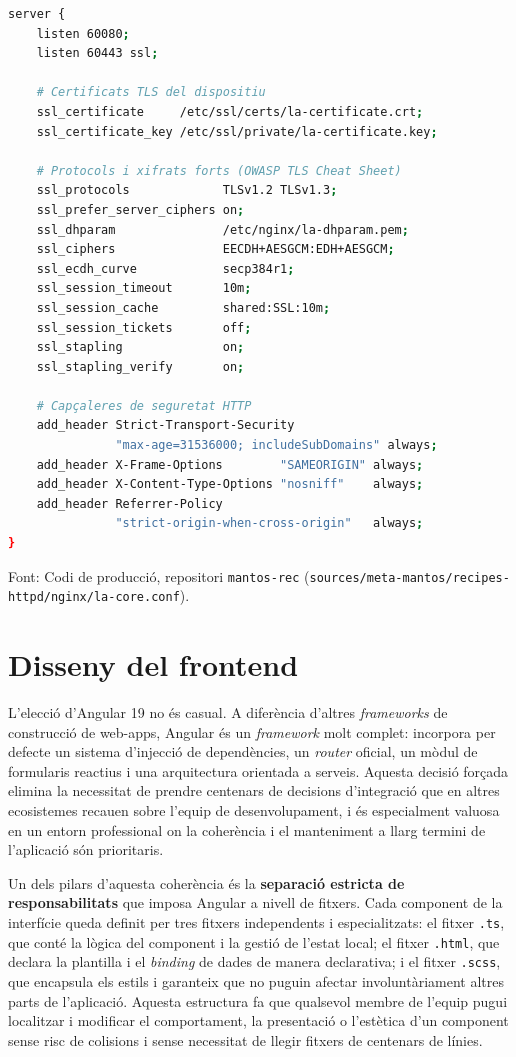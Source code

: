 \clearpage
\begin{lstlisting}[language=bash, label={lst:nginx_security}, caption={Fragment de la configuració NGINX (la-core.conf): TLS i capçaleres de seguretat HTTP.}, float=!ht]
server {
    listen 60080;
    listen 60443 ssl;

    # Certificats TLS del dispositiu
    ssl_certificate     /etc/ssl/certs/la-certificate.crt;
    ssl_certificate_key /etc/ssl/private/la-certificate.key;

    # Protocols i xifrats forts (OWASP TLS Cheat Sheet)
    ssl_protocols             TLSv1.2 TLSv1.3;
    ssl_prefer_server_ciphers on;
    ssl_dhparam               /etc/nginx/la-dhparam.pem;
    ssl_ciphers               EECDH+AESGCM:EDH+AESGCM;
    ssl_ecdh_curve            secp384r1;
    ssl_session_timeout       10m;
    ssl_session_cache         shared:SSL:10m;
    ssl_session_tickets       off;
    ssl_stapling              on;
    ssl_stapling_verify       on;

    # Capçaleres de seguretat HTTP
    add_header Strict-Transport-Security
               "max-age=31536000; includeSubDomains" always;
    add_header X-Frame-Options        "SAMEORIGIN" always;
    add_header X-Content-Type-Options "nosniff"    always;
    add_header Referrer-Policy
               "strict-origin-when-cross-origin"   always;
}
\end{lstlisting}
\smallskip\par{\small\noindent Font: Codi de producció, repositori \texttt{mantos-rec} (\texttt{sources/\allowbreak{}meta-mantos/\allowbreak{}recipes-httpd/\allowbreak{}nginx/\allowbreak{}la-core.conf}).}

\section{Disseny del frontend}
L'elecció d'Angular 19 no és casual. A diferència d'altres \textit{frameworks} de construcció de web-apps, Angular és un \textit{framework} molt complet: incorpora per defecte un sistema d'injecció de dependències, un \textit{router} oficial, un mòdul de formularis reactius i una arquitectura orientada a serveis. Aquesta decisió forçada elimina la necessitat de prendre centenars de decisions d'integració que en altres ecosistemes recauen sobre l'equip de desenvolupament, i és especialment valuosa en un entorn professional on la coherència i el manteniment a llarg termini de l'aplicació són prioritaris.

Un dels pilars d'aquesta coherència és la \textbf{separació estricta de responsabilitats} que imposa Angular a nivell de fitxers. Cada component de la interfície queda definit per tres fitxers independents i especialitzats: el fitxer \texttt{.ts}, que conté la lògica del component i la gestió de l'estat local; el fitxer \texttt{.html}, que declara la plantilla i el \textit{binding} de dades de manera declarativa; i el fitxer \texttt{.scss}, que encapsula els estils i garanteix que no puguin afectar involuntàriament altres parts de l'aplicació. Aquesta estructura fa que qualsevol membre de l'equip pugui localitzar i modificar el comportament, la presentació o l'estètica d'un component sense risc de colisions i sense necessitat de llegir fitxers de centenars de línies.

